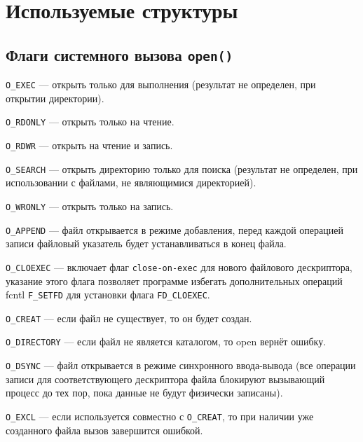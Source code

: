 \chapter{Используемые структуры}




\section*{Флаги системного вызова \texttt{open()}}

\texttt{O\_EXEC} --- открыть только для выполнения (результат не определен, при открытии директории).

\texttt{O\_RDONLY} --- открыть только на чтение.

\texttt{O\_RDWR} --- открыть на чтение и запись.

\texttt{O\_SEARCH} --- открыть директорию только для поиска (результат не определен, при использовании с файлами, не являющимися директорией).

\texttt{O\_WRONLY} --- открыть только на запись.

\texttt{O\_APPEND} --- файл открывается в режиме добавления, перед каждой операцией записи файловый указатель будет устанавливаться в конец файла.

\texttt{O\_CLOEXEC} --- включает флаг \texttt{close-on-exec} для нового файлового дескриптора, указание этого флага позволяет программе избегать дополнительных операций fcntl \texttt{F\_SETFD} для установки флага \texttt{FD\_CLOEXEC}.

\texttt{O\_CREAT} --- если файл не существует, то он будет создан.

\texttt{O\_DIRECTORY} --- если файл не является каталогом, то open вернёт ошибку.

\texttt{O\_DSYNC} --- файл открывается в режиме синхронного ввода-вывода (все операции записи для соответствующего дескриптора файла блокируют вызывающий процесс до тех пор, пока данные не будут физически записаны).

\texttt{O\_EXCL} --- если используется совместно с \texttt{O\_CREAT}, то при наличии уже созданного файла вызов завершится ошибкой.

